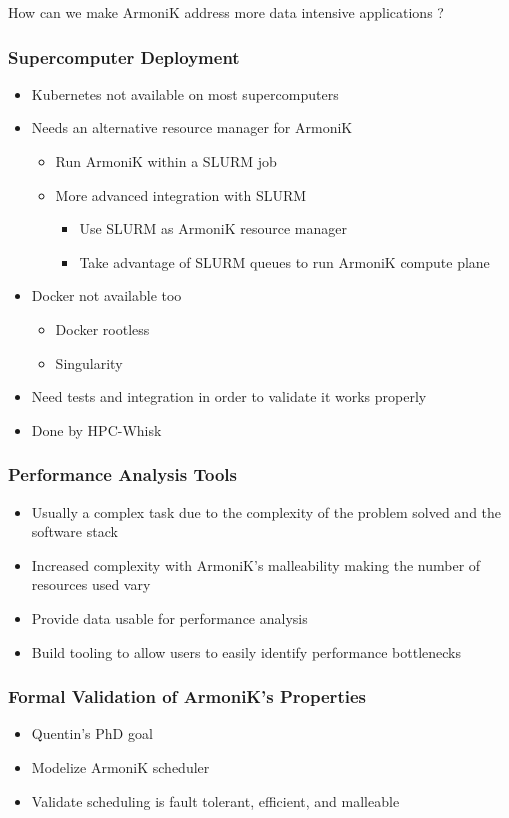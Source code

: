 \documentclass[10pt,aspectratio=1609]{beamer}
\begin{document}
\begin{section}{How can we make ArmoniK address more data intensive applications ?}
  \begin{frame}
    \frametitle{Supercomputer Deployment}
    \begin{itemize}
      \item Kubernetes not available on most supercomputers
      \item Needs an alternative resource manager for ArmoniK
      \begin{itemize}
        \item Run ArmoniK within a SLURM job
        \item More advanced integration with SLURM
        \begin{itemize}
          \item Use SLURM as ArmoniK resource manager
          \item Take advantage of SLURM queues to run ArmoniK compute plane
        \end{itemize}
      \end{itemize}
      \item Docker not available too
      \begin{itemize}
        \item Docker rootless
        \item Singularity
      \end{itemize}
      \item Need tests and integration in order to validate it works properly
      \item Done by HPC-Whisk
    \end{itemize}
  \end{frame}

  \begin{frame}
    \frametitle{Performance Analysis Tools}
    \begin{itemize}
      \item Usually a complex task due to the complexity of the problem solved and the software stack
      \item Increased complexity with ArmoniK's malleability making the number of resources used vary
      \item Provide data usable for performance analysis
      \item Build tooling to allow users to easily identify performance bottlenecks
    \end{itemize}
  \end{frame}

  \begin{frame}
    \frametitle{Formal Validation of ArmoniK's Properties}
    \begin{itemize}
      \item Quentin's PhD goal
      \item Modelize ArmoniK scheduler
      \item Validate scheduling is fault tolerant, efficient, and malleable
    \end{itemize}
  \end{frame}


\end{section}
\end{document}
